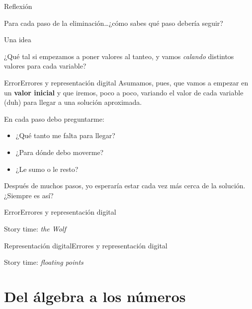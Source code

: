 \documentclass[spanish, c]{beamer}
\begin{document}
\begin{frame}{Reflexión}
    \begin{center}
        \Huge Para cada paso de la eliminación\dots ¿cómo sabes qué paso debería seguir?
    \end{center}
\end{frame}

\begin{frame}{Una idea}
    \begin{center}
        \Huge
        ¿Qué tal si empezamos a poner valores al tanteo, y vamos \textit{calando} distintos valores para cada variable?
    \end{center}
\end{frame}

\begin{frame}{Error}{Errores y representación digital}
Asumamos, pues, que vamos a empezar en un \textbf{valor inicial} y que iremos, poco a poco, variando el valor de cada variable ({\footnotesize duh}) para llegar a una solución aproximada. \pause

En cada paso debo preguntarme: \pause

\begin{itemize}[<+->]
    \item ¿Qué tanto me falta para llegar?
    \item ¿Para dónde debo moverme?
    \item ¿Le sumo o le resto?
\end{itemize} \pause

Después de muchos pasos, yo esperaría estar cada vez más cerca de la solución. ¿Siempre es así?
\end{frame}

\begin{frame}{Error}{Errores y representación digital}
    
    \begin{center}
        {\Huge Story time: \textit{the Wolf}}
    \end{center}
\end{frame}

\begin{frame}{Representación digital}{Errores y representación digital}
    \begin{center}
        {\Huge Story time: \textit{floating points}}
    \end{center}
\end{frame}

\section{Del álgebra a los números}
\end{document}

